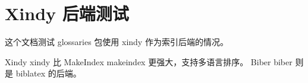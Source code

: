 \documentclass{article}
\begin{document}
\section{Xindy 后端测试}

这个文档测试 glossaries 包使用 xindy 作为索引后端的情况。

Xindy \gls{xindy} 比 MakeIndex \gls{makeindex} 更强大，支持多语言排序。
Biber \gls{biber} 则是 biblatex 的后端。

\printglossaries
\end{document}
